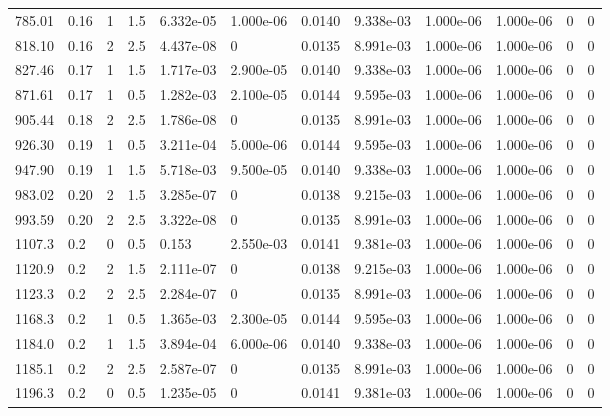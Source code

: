 \documentclass[preview]{standalone}
\begin{document}
{{\begin{tabular}{L{1.2cm}C{1.2cm} C{0.3cm}C{0.5cm} C{1.4cm}C{1.4cm} C{1.4cm}C{1.4cm} C{1.6cm}C{1.6cm} C{1.6cm}C{1.6cm}}
  785.01  &  0.16  & 1     & 1.5 &  6.332e-05  & 1.000e-06  &  0.0140&   9.338e-03& 1.000e-06 & 1.000e-06   &  0 & 0  \\ 
  818.10  &  0.16  & 2     & 2.5 &  4.437e-08  & 0  &  0.0135&   8.991e-03& 1.000e-06 & 1.000e-06   &  0 & 0  \\ 
  827.46  &  0.17  & 1     & 1.5 &  1.717e-03  & 2.900e-05  &  0.0140&   9.338e-03& 1.000e-06 & 1.000e-06   &  0 & 0  \\ 
  871.61  &  0.17  & 1     & 0.5 &  1.282e-03  & 2.100e-05  &  0.0144&   9.595e-03& 1.000e-06 & 1.000e-06   &  0 & 0  \\ 
  905.44  &  0.18  & 2     & 2.5 &  1.786e-08  & 0  &  0.0135&   8.991e-03& 1.000e-06 & 1.000e-06   &  0 & 0  \\ 
  926.30  &  0.19  & 1     & 0.5 &  3.211e-04  & 5.000e-06  &  0.0144&   9.595e-03& 1.000e-06 & 1.000e-06   &  0 & 0  \\ 
  947.90  &  0.19  & 1     & 1.5 &  5.718e-03  & 9.500e-05  &  0.0140&   9.338e-03& 1.000e-06 & 1.000e-06   &  0 & 0  \\ 
  983.02  &  0.20  & 2     & 1.5 &  3.285e-07  & 0  &  0.0138&   9.215e-03& 1.000e-06 & 1.000e-06   &  0 & 0  \\ 
  993.59  &  0.20  & 2     & 2.5 &  3.322e-08  & 0  &  0.0135&   8.991e-03& 1.000e-06 & 1.000e-06   &  0 & 0  \\ 
  1107.3  &   0.2  & 0     & 0.5 &  0.153  & 2.550e-03  &  0.0141&   9.381e-03& 1.000e-06 & 1.000e-06   &  0 & 0  \\ 
  1120.9  &   0.2  & 2     & 1.5 &  2.111e-07  & 0  &  0.0138&   9.215e-03& 1.000e-06 & 1.000e-06   &  0 & 0  \\ 
  1123.3  &   0.2  & 2     & 2.5 &  2.284e-07  & 0  &  0.0135&   8.991e-03& 1.000e-06 & 1.000e-06   &  0 & 0  \\ 
  1168.3  &   0.2  & 1     & 0.5 &  1.365e-03  & 2.300e-05  &  0.0144&   9.595e-03& 1.000e-06 & 1.000e-06   &  0 & 0  \\ 
  1184.0  &   0.2  & 1     & 1.5 &  3.894e-04  & 6.000e-06  &  0.0140&   9.338e-03& 1.000e-06 & 1.000e-06   &  0 & 0  \\ 
  1185.1  &   0.2  & 2     & 2.5 &  2.587e-07  & 0  &  0.0135&   8.991e-03& 1.000e-06 & 1.000e-06   &  0 & 0  \\ 
  1196.3  &   0.2  & 0     & 0.5 &  1.235e-05  & 0  &  0.0141&   9.381e-03& 1.000e-06 & 1.000e-06   &  0 & 0  \\ 
\hline 
\end{tabular} 

}}
\end{document}
